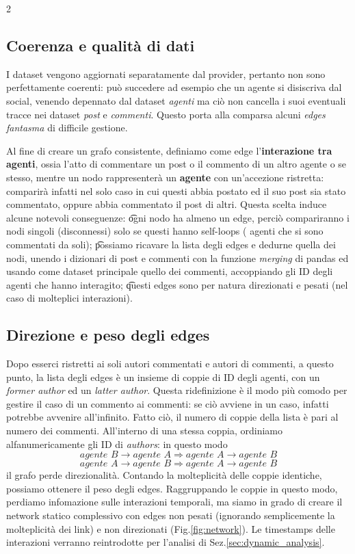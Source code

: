 \documentclass{article}
\begin{document}
\begin{multicols}{2}
   \subsection{Coerenza e qualità di dati}
   I dataset vengono aggiornati separatamente dal provider, pertanto non sono perfettamente coerenti: può
   succedere ad esempio che un agente si disiscriva dal social, venendo depennato dal dataset \textit{agenti}
   ma ciò non cancella i suoi eventuali tracce nei dataset \textit{post} e \textit{commenti}.
   Questo porta alla comparsa alcuni \textit{edges fantasma} di difficile gestione.
   
   Al fine di creare un grafo consistente, definiamo come edge l'\textbf{interazione tra agenti}, ossia l'atto
   di commentare un post o il commento di un altro agente o se stesso, mentre un nodo rappresenterà un
   \textbf{agente} con un'accezione ristretta: comparirà infatti nel solo caso in cui questi abbia postato ed il suo post sia stato commentato, oppure abbia commentato il post di altri.
   Questa scelta induce alcune notevoli conseguenze:
   \t ogni nodo ha almeno un edge, perciò compariranno i nodi singoli (disconnessi) solo se questi hanno
   self-loops ( agenti che si sono commentati da soli);
   \t possiamo ricavare la lista degli edges e dedurne quella dei nodi, unendo i dizionari di post e commenti con la funzione
   \textit{merging} di pandas ed usando come dataset principale quello dei commenti, accoppiando gli ID degli agenti che hanno interagito;
   \t questi edges sono per natura direzionati e pesati (nel caso di molteplici interazioni).
   
   \subsection{Direzione e peso degli edges}
   Dopo esserci ristretti ai soli autori commentati e autori di commenti, a questo punto, la lista degli edges è un insieme di
   coppie di ID degli agenti, con un \textit{former author} ed un \textit{latter author}.
   Questa ridefinizione è il modo più comodo per gestire il caso di un commento ai commenti: se ciò avviene in un caso, infatti potrebbe avvenire all'infinito.
   Fatto ciò, il numero di coppie della lista è pari al numero dei commenti.
   All'interno di una stessa coppia, ordiniamo alfanumericamente gli ID di \textit{authors}: in questo modo
   \[ \textit{agente B}\rightarrow\textit{agente A} \Rightarrow \textit{agente A}\rightarrow\textit{agente B} \]
   \[ \textit{agente A}\rightarrow\textit{agente B} \Rightarrow \textit{agente A}\rightarrow\textit{agente B} \]
   il grafo perde direzionalità.
   Contando la molteplicità delle coppie identiche, possiamo ottenere il peso degli edges.
   Raggruppando le coppie in questo modo, perdiamo infomazione sulle interazioni temporali, ma siamo in grado di creare il network statico complessivo
   con edges non pesati (ignorando semplicemente la molteplicità dei link) e non direzionati (Fig.\ref{fig:network}).
   Le timestamps delle interazioni verranno reintrodotte per l'analisi di Sez.\ref{sec:dynamic_analysis}.
   
   \hrulefill
\end{multicols}
\end{document}
